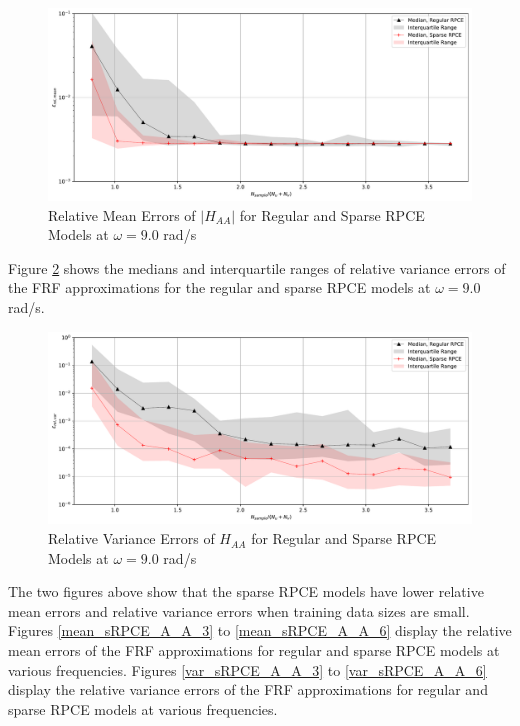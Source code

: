 \begin{figure}[H]
    \centering
    \includegraphics[width=1.0\textwidth]{
        plots/surrogate/plot_2_A_2.pdf
    }
    \caption{%
        Relative Mean Errors of $\left|H_{AA}\right|$ for Regular and Sparse RPCE Models at $\omega=9.0$ rad/s
    }
    \label{mean_sRPCE_A_A_2}
\end{figure}
Figure \ref{var_sRPCE_A_A_2} shows the medians and interquartile ranges of relative variance errors of the FRF approximations for the regular and sparse RPCE models at $\omega=9.0$ rad/s.
\begin{figure}[H]
    \centering
    \includegraphics[width=1.0\textwidth]{
        plots/surrogate/plot_3_A_2.pdf
    }
    \caption{%
        Relative Variance Errors of $H_{AA}$ for Regular and Sparse RPCE Models at $\omega=9.0$ rad/s
    }
    \label{var_sRPCE_A_A_2}
\end{figure}
The two figures above show that the sparse RPCE models have lower relative mean errors and relative variance errors when training data sizes are small.
Figures \ref{mean_sRPCE_A_A_3} to \ref{mean_sRPCE_A_A_6} display the relative mean errors of the FRF approximations for regular and sparse RPCE models at various frequencies.
Figures \ref{var_sRPCE_A_A_3} to \ref{var_sRPCE_A_A_6} display the relative variance errors of the FRF approximations for regular and sparse RPCE models at various frequencies.
